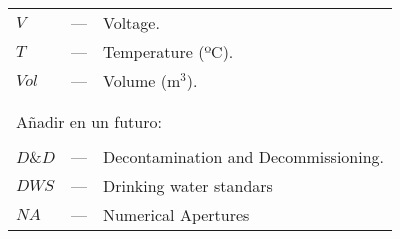 \begin{longtable}{p{25mm} c p{120mm} }
$V$ & --- & Voltage.\\
$T$ & --- & Temperature (ºC).\\
$Vol$ & --- & Volume (m$^3$).\\


\\
\\
\multicolumn{3}{l}{Añadir en un futuro:}\\
\\
$D\&D$ & --- & Decontamination and Decommissioning.\\
$DWS$ & --- & Drinking water standars\\


$NA$ & --- & Numerical Apertures\\

\end{longtable}
